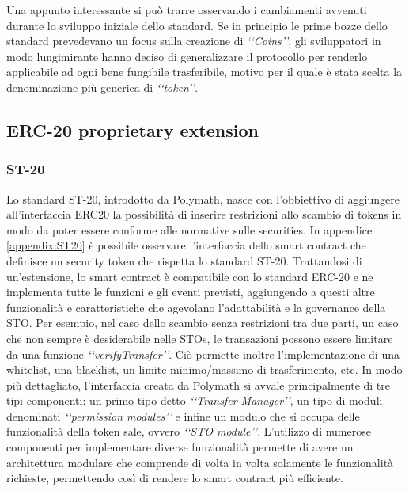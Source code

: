 Una appunto interessante si può trarre osservando i cambiamenti avvenuti durante lo sviluppo iniziale dello standard. Se in principio le prime bozze dello standard prevedevano un focus sulla creazione di \textit{‘‘Coins’’}, gli sviluppatori in modo lungimirante hanno deciso di generalizzare il protocollo per renderlo applicabile ad ogni bene fungibile trasferibile, motivo per il quale è stata scelta la denominazione più generica di \textit{‘‘token’’}.

\subsection{ERC-20 proprietary extension}
\subsubsection{ST-20}
Lo standard ST-20, introdotto da Polymath, nasce con l'obbiettivo di aggiungere all'interfaccia ERC20 la possibilità di inserire restrizioni allo scambio di tokens in modo da poter essere conforme alle normative sulle securities. 
In appendice \ref{appendix:ST20} è possibile osservare l'interfaccia dello smart contract che definisce un security token che rispetta lo standard ST-20. Trattandosi di un'estensione, lo smart contract è compatibile con lo standard ERC-20 e ne implementa tutte le funzioni e gli eventi previsti, aggiungendo a questi altre funzionalità e caratteristiche che agevolano l'adattabilità e la governance della STO. Per esempio, nel caso dello scambio senza restrizioni tra due parti, un caso che non sempre è desiderabile nelle STOs, le transazioni possono essere limitare da una funzione \textit{‘‘verifyTransfer’’}. Ciò permette inoltre l'implementazione di una whitelist, una blacklist, un limite minimo/massimo di trasferimento, etc. 
In modo più dettagliato, l'interfaccia creata da Polymath si avvale principalmente di tre tipi componenti: un primo tipo detto \textit{‘‘Transfer Manager’’}, un tipo di moduli denominati \textit{‘‘permission modules’’} e infine un modulo che si occupa delle funzionalità della token sale, ovvero \textit{‘‘STO module’’}. 
L'utilizzo di numerose componenti per implementare diverse funzionalità permette di avere un architettura modulare che comprende di volta in volta solamente le funzionalità richieste, permettendo così di rendere lo smart contract più efficiente.

